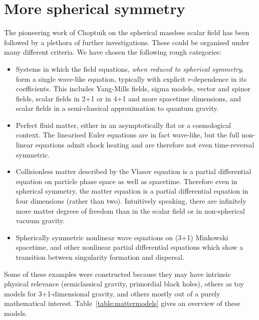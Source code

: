 \documentclass{article}
\begin{document}
\section{More spherical symmetry}
\label{section:spherical}

The pioneering work of Choptuik on the spherical massless scalar field
has been followed by a plethora of further investigations. These could
be organised under many different criteria. We have chosen the
following rough categories:

\begin{itemize}

\item Systems in which the field equations, {\em when reduced to
  spherical symmetry}, form a single wave-like equation, typically
  with explicit $r$-dependence in its coefficients. This
  includes Yang-Mills fields, sigma models, vector and spinor fields,
  scalar fields in 2+1 or in 4+1 and more spacetime dimensions,
  and scalar fields in a semi-classical approximation to quantum
  gravity. 

\item Perfect fluid matter, either in an asymptotically flat or a
  cosmological context. The linearised Euler equations are in fact
  wave-like, but the full non-linear equations admit shock heating and
  are therefore not even time-reversal symmetric. 

\item Collisionless matter described by the Vlasov equation 
  is a partial differential equation on particle phase space as
  well as spacetime. Therefore
  even in spherical symmetry, the matter equation is a partial
  differential equation in four dimensions (rather than two). Intuitively
  speaking, there are infinitely more matter degrees of freedom than
  in the scalar field or in non-spherical vacuum gravity.

\item Spherically symmetric nonlinear wave equations on (3+1) Minkowski
  spacetime, and other nonlinear partial differential equations which
  show a transition between singularity formation and dispersal. 

\end{itemize}

Some of these examples were constructed because they may have intrinsic
physical relevance (semiclassical gravity, primordial black holes),
others as toy models for 3+1-dimensional gravity, and others mostly 
out of a purely mathematical interest. Table~\ref{table:mattermodels}
gives an overview of these models.
\end{document}
